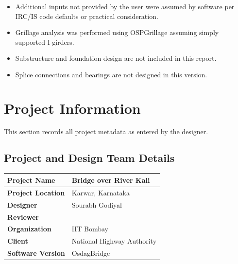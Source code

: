 \documentclass[12pt,a4paper]{report}
\numberwithin{table}{chapter}
\numberwithin{figure}{chapter}
\begin{document}
\begin{itemize}
\item Additional inputs not provided by the user were assumed by software per IRC/IS code defaults or practical consideration.
\item Grillage analysis was performed using OSPGrillage assuming simply supported I-girders.
\item Substructure and foundation design are not included in this report.
\item Splice connections and bearings are not designed in this version.
\end{itemize}

\titleformat{\chapter}[block]{\normalfont\Large\bfseries\centering}{\thechapter}{1em}{}
\titlespacing*{\chapter}{0pt}{-30pt}{10pt}


\chapter{Project Information}

This section records all project metadata as entered by the designer.

\section{Project and Design Team Details}
\label{sec:project-details}

\begin{tabular}{|L{5.5cm}|L{8.5cm}|}
\hline
\textbf{Project Name} & Bridge over River Kali \\
\hline
\textbf{Project Location} & Karwar, Karnataka \\
\hline
\textbf{Designer} & Sourabh Godiyal \\
\hline
\textbf{Reviewer} &  \\
\hline
\textbf{Organization} & IIT Bombay \\
\hline
\textbf{Client} & National Highway Authority \\
\hline
\textbf{Software Version} & OsdagBridge \\
\hline
\end{tabular}
\end{document}
